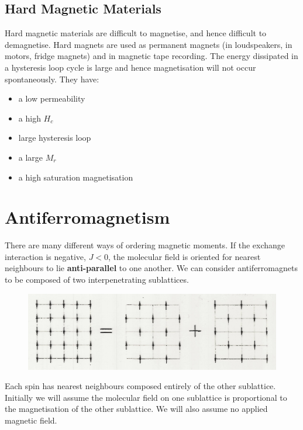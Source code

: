 \documentclass[a4paper, 11pt, normalem]{report}
\begin{document}
\subsection{Hard Magnetic Materials}
Hard magnetic materials are difficult to magnetise, and hence difficult to demagnetise. 
Hard magnets are used as permanent magnets (in loudspeakers, in motors, fridge magnets) and in magnetic tape recording.
The energy dissipated in a hysteresis loop cycle is large and hence magnetisation will not occur spontaneously. 
They have:
\begin{itemize}
    \item a low permeability
    \item a high $H_c$
    \item large hysteresis loop
    \item a large $M_r$
    \item a high saturation magnetisation
\end{itemize}

\section{Antiferromagnetism}
There are many different ways of ordering magnetic moments. 
If the exchange interaction is negative, $J<0$, the molecular field is oriented for nearest neighbours to lie \textbf{anti-parallel} to one another. 
We can consider antiferromagnets to be composed of two interpenetrating sublattices.
\begin{figure}[H]
    \centering
    \includegraphics[scale=0.5]{sublat.png}
\end{figure}
Each spin has nearest neighbours composed entirely of the other sublattice.
Initially we will assume the molecular field on one sublattice is proportional to the magnetisation of the other sublattice. 
We will also assume no applied magnetic field. 
\end{document}
